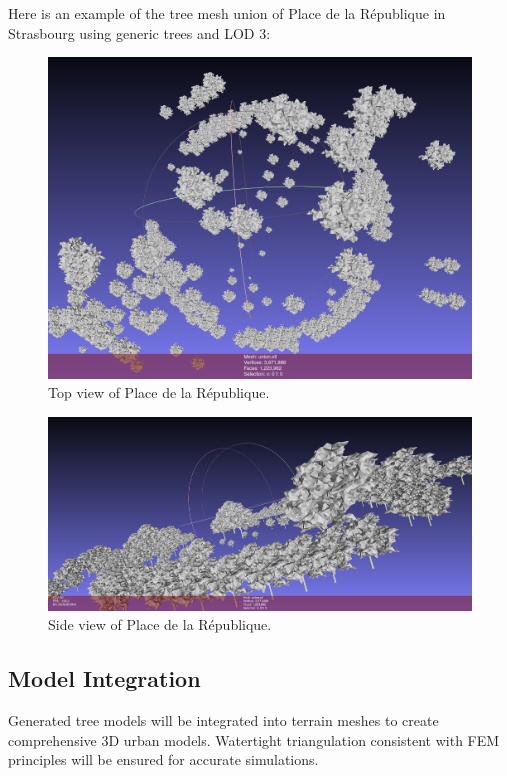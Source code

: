 \documentclass[12pt]{article}
\begin{document}
Here is an example of the tree mesh union of Place de la République in Strasbourg
using generic trees and LOD 3:

\begin{figure}[H]
    \centering
        \centering
        \includegraphics[width=\textwidth]{images/republic_top.png}
        \caption{Top view of Place de la République.}
\end{figure}

\begin{figure}[H]
        \centering
        \includegraphics[width=\textwidth]{images/republic.png}
        \caption{Side view of Place de la République.}
\end{figure}

\subsection{Model Integration}
Generated tree models will be integrated into terrain meshes to create comprehensive 
3D urban models. Watertight triangulation consistent with FEM principles will be ensured 
for accurate simulations.
\end{document}
